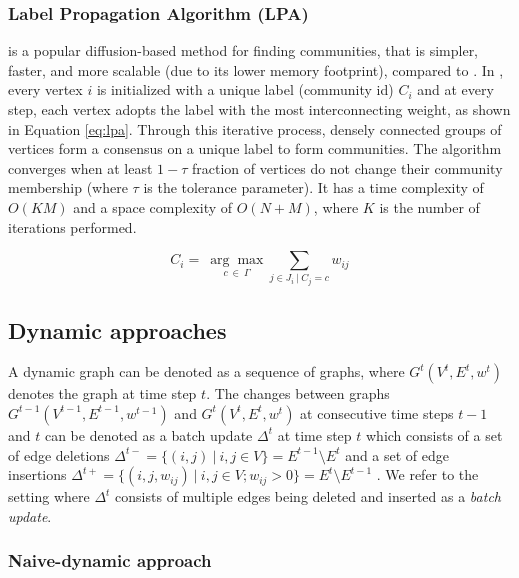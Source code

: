 \subsubsection{Label Propagation Algorithm (LPA) \cite{com-raghavan07}}
\label{sec:about-rak}

\LPA{} is a popular diffusion-based method for finding communities, that is simpler, faster, and more scalable (due to its lower memory footprint), compared to \Lou{}. In \LPA{}, every vertex $i$ is initialized with a unique label (community id) $C_i$ and at every step, each vertex adopts the label with the most interconnecting weight, as shown in Equation \ref{eq:lpa}. Through this iterative process, densely connected groups of vertices form a consensus on a unique label to form communities. The algorithm converges when at least $1-\tau$ fraction of vertices do not change their community membership (where $\tau$ is the tolerance parameter). It has a time complexity of $O(KM)$ and a space complexity of $O(N + M)$, where $K$ is the number of iterations performed.

\begin{equation}
\label{eq:lpa}
  C_i =\ \underset{c\ \in \ \Gamma}{\arg\max} { \sum_{j \in J_i\ |\ C_j = c} w_{ij} }
\end{equation}




\subsection{Dynamic approaches}
\label{sec:dynamic-graphs}

A dynamic graph can be denoted as a sequence of graphs, where $G^t(V^t, E^t, w^t)$ denotes the graph at time step $t$. The changes between graphs $G^{t-1}(V^{t-1}, E^{t-1}, w^{t-1})$ and $G^t(V^t, E^t, w^t)$ at consecutive time steps $t-1$ and $t$ can be denoted as a batch update $\Delta^t$ at time step $t$ which consists of a set of edge deletions $\Delta^{t-} = \{(i, j)\ |\ i, j \in V\} = E^{t-1} \setminus E^t$ and a set of edge insertions $\Delta^{t+} = \{(i, j, w_{ij})\ |\ i, j \in V; w_{ij} > 0\} = E^t \setminus E^{t-1}$ \cite{com-zarayeneh21}. We refer to the setting where $\Delta^t$ consists of multiple edges being deleted and inserted as a \textit{batch update}.


\subsubsection{Naive-dynamic approach}
\label{sec:naive-dynamic}

